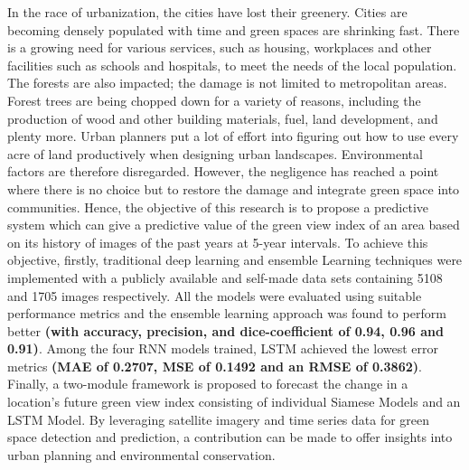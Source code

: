 \justifying
         In the race of urbanization, the cities have lost their greenery. Cities are becoming densely populated with time and green spaces are shrinking fast. There is a growing need for various services, such as housing, workplaces and other facilities such as schools and hospitals, to meet the needs of the local population. The forests are also impacted; the damage is not limited to metropolitan areas. Forest trees are being chopped down for a variety of reasons, including the production of wood and other building materials, fuel, land development, and plenty more. Urban planners put a lot of effort into figuring out how to use every acre of land productively when designing urban landscapes. Environmental factors are therefore disregarded. However, the negligence has reached a point where there is no choice but to restore the damage and integrate green space into communities. Hence, the objective of this research is to propose a predictive system which can give a predictive value of the green view index of an area based on its history of images of the past years at 5-year intervals. To achieve this objective, firstly, traditional deep learning and ensemble Learning techniques were implemented with a publicly available and self-made data sets containing 5108 and 1705 images respectively. All the models were evaluated using suitable performance metrics and the ensemble learning approach was found to perform better \textbf{(with accuracy, precision, and dice-coefficient of 0.94, 0.96 and 0.91)}. Among the four RNN models trained, LSTM achieved the lowest error metrics \textbf{(MAE of 0.2707, MSE of 0.1492 and an RMSE of 0.3862)}. Finally, a two-module framework is proposed to forecast the change in a location's future green view index consisting of individual Siamese Models and an LSTM Model. By leveraging satellite imagery and time series data for green space detection and prediction, a contribution can be made to offer insights into urban planning and environmental
conservation.
